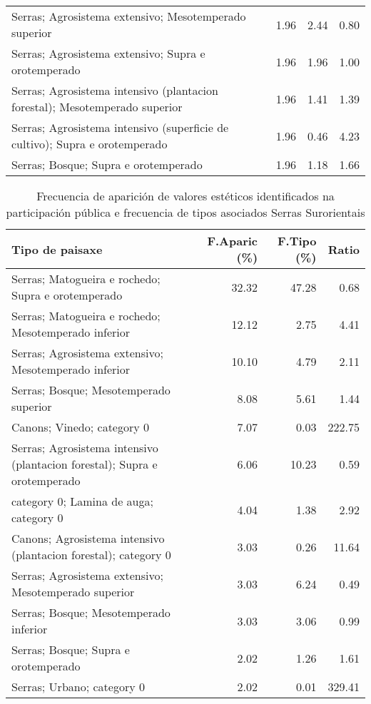 \begin{table}[p]
\begin{tabular}{lrrr}
  Serras; Agrosistema extensivo; Mesotemperado superior & 1.96 & 2.44 & 0.80 \\ 
  Serras; Agrosistema extensivo; Supra e orotemperado & 1.96 & 1.96 & 1.00 \\ 
  Serras; Agrosistema intensivo (plantacion forestal); Mesotemperado superior & 1.96 & 1.41 & 1.39 \\ 
  Serras; Agrosistema intensivo (superficie de cultivo); Supra e orotemperado & 1.96 & 0.46 & 4.23 \\ 
  Serras; Bosque; Supra e orotemperado & 1.96 & 1.18 & 1.66 \\ 
   \hline
\end{tabular}
\end{table}
\begin{table}[p]
\centering
\caption{Frecuencia de aparición de valores estéticos identificados na participación pública e frecuencia de tipos asociados Serras Surorientais} 
\label{vsixotest9}
\begin{tabular}{lrrr}
  \hline
Tipo de paisaxe & F.Aparic (\%) & F.Tipo (\%) & Ratio \\ 
  \hline
Serras; Matogueira e rochedo; Supra e orotemperado & 32.32 & 47.28 & 0.68 \\ 
  Serras; Matogueira e rochedo; Mesotemperado inferior & 12.12 & 2.75 & 4.41 \\ 
  Serras; Agrosistema extensivo; Mesotemperado inferior & 10.10 & 4.79 & 2.11 \\ 
  Serras; Bosque; Mesotemperado superior & 8.08 & 5.61 & 1.44 \\ 
  Canons; Vinedo; category 0 & 7.07 & 0.03 & 222.75 \\ 
  Serras; Agrosistema intensivo (plantacion forestal); Supra e orotemperado & 6.06 & 10.23 & 0.59 \\ 
  category 0; Lamina de auga; category 0 & 4.04 & 1.38 & 2.92 \\ 
  Canons; Agrosistema intensivo (plantacion forestal); category 0 & 3.03 & 0.26 & 11.64 \\ 
  Serras; Agrosistema extensivo; Mesotemperado superior & 3.03 & 6.24 & 0.49 \\ 
  Serras; Bosque; Mesotemperado inferior & 3.03 & 3.06 & 0.99 \\ 
  Serras; Bosque; Supra e orotemperado & 2.02 & 1.26 & 1.61 \\ 
  Serras; Urbano; category 0 & 2.02 & 0.01 & 329.41 \\ 

\end{tabular}
\end{table}
